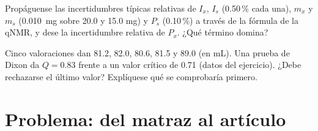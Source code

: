 \begin{exercise}[$\star\star\star$]\label{exo:b3:lab-techniques-3:11}
Propáguense las incertidumbres típicas relativas de $I_x$, $I_s$ (0.50\,\% cada una), $m_x$ y $m_s$ (\qty{0.010}{mg} sobre 20.0
y 15.0 mg) y $P_s$ (0.10\,\%) a través de la fórmula de la qNMR, y dese la incertidumbre relativa de $P_x$.
¿Qué término domina?
\end{exercise}

\begin{exercise}[$\star\star\star$]\label{exo:b3:lab-techniques-3:12}
Cinco valoraciones dan 81.2, 82.0, 80.6, 81.5 y 89.0 (en mL). Una prueba de Dixon da
$Q = 0.83$ frente a un valor crítico de 0.71 (datos del ejercicio). ¿Debe rechazarse el último
valor? Explíquese qué se comprobaría primero.
\end{exercise}

\section{Problema: del matraz al artículo}


